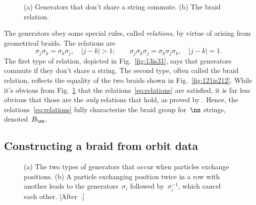 \documentclass[12pt]{article}
\begin{document}
%
\begin{figure}
  \begin{center}
    \subfigure[]{
      \raisebox{.09\textwidth}{%
        \texttt{[image: 13is31]}}
      \label{fig:13is31}
    }\hspace{.1\textwidth}
    \subfigure[]{
      \texttt{[image: 121is212]}
      \label{fig:121is212}
    }
  \end{center}
  \caption{(a) Generators that don't share a string commute.  (b) The braid
    relation.}
  \label{fig:relations}
\end{figure}
%
The generators obey some special rules, called \emph{relations}, by virtue of
arising from geometrical braids.  The relations are
\begin{equation}
  \sigma_j\sigma_k=\sigma_k\sigma_j, \quad \lvert j-k\rvert > 1; \qquad
  \sigma_j\sigma_k\sigma_j = \sigma_k\sigma_j\sigma_k, \quad \lvert j-k\rvert=1.
  \label{eq:relations}
\end{equation}
The first type of relation, depicted in Fig.~\ref{fig:13is31}, says that
generators commute if they don't share a string.  The second type, often
called the braid relation, reflects the equality of the two braids shown in
Fig.~\ref{fig:121is212}.  While it's obvious from Fig.~\ref{fig:relations}
that the relations~\eqref{eq:relations} are satisfied, it is far less obvious
that those are the \emph{only} relations that hold, as proved by
\citet{Artin1947}.  Hence, the relations~\eqref{eq:relations} fully
characterize the braid group for~$\nn$ strings, denoted~$B_\nn$.

%


\subsection{Constructing a braid from orbit data}
\label{sec:braidfromorbitdata}

%
%
\begin{figure}
  \begin{center}
    \hspace{.2\textwidth}
  \end{center}
  \caption{(a) The two types of generators that occur when particles exchange
    positions.  (b) A particle exchanging position twice in a row with another
    leads to the generators~$\sigma_i$ followed by~$\sigma_i^{-1}$, which
    cancel each other. [After~\citet{Thiffeault2005}.]}
\end{figure}
%
\end{document}
